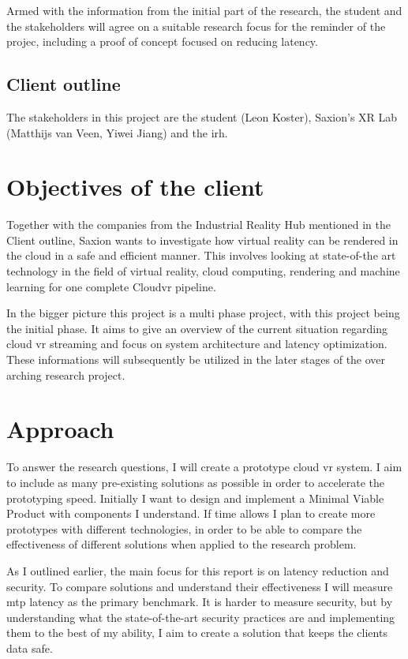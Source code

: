 \documentclass[]{article}
\begin{document}
Armed with the information from the initial part of the research, the student and the stakeholders will agree on a suitable research focus for the reminder of the projec, including a proof of concept focused on reducing latency.
\subsection{Client outline}
The stakeholders in this project are the student (Leon Koster), Saxion's XR Lab (Matthijs van Veen, Yiwei Jiang) and the \acrfull{irh}.

\newpage
\section{Objectives of the client}
Together with the companies from the Industrial Reality Hub mentioned in the Client outline, Saxion wants to investigate how virtual reality can be rendered in the cloud in a safe and efficient manner. This involves looking at state-of-the art technology in the field of virtual reality, cloud computing, rendering and machine learning for one complete Cloud\acrshort{vr} pipeline. 

In the bigger picture this project is a multi phase project, with this project being the initial phase. It aims to give an overview of the current situation regarding cloud \acrshort{vr} streaming and focus on system architecture and latency optimization. These informations will subsequently be utilized in the later stages of the over arching research project.






\section{Approach}
To answer the research questions, I will create a prototype cloud \acrshort{vr} system. I aim to include as many pre-existing solutions as possible in order to accelerate the prototyping speed. Initially I want to design and implement a Minimal Viable Product with components I understand. If time allows I plan to create more prototypes with different technologies, in order to be able to compare the effectiveness of different solutions when applied to the research problem.

As I outlined earlier, the main focus for this report is on latency reduction and security. To compare solutions and understand their effectiveness I will measure \acrfull{mtp} latency as the primary benchmark. It is harder to measure security, but by understanding what the state-of-the-art security practices are and implementing them to the best of my ability, I aim to create a solution that keeps the clients data safe.
\end{document}
